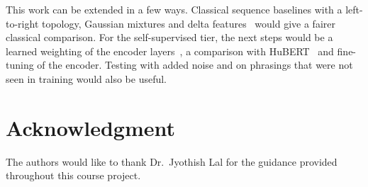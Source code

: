 \documentclass[conference]{IEEEtran}
\begin{document}
This work can be extended in a few ways. Classical sequence baselines with a left-to-right topology, Gaussian mixtures and delta features~\cite{furui1986delta} would give a fairer classical comparison. For the self-supervised tier, the next steps would be a learned weighting of the encoder layers~\cite{yang2021superb}, a comparison with HuBERT~\cite{hsu2021hubert} and fine-tuning of the encoder. Testing with added noise and on phrasings that were not seen in training would also be useful.

\section*{Acknowledgment}
The authors would like to thank Dr.~Jyothish Lal for the guidance provided throughout this course project.



\end{document}

